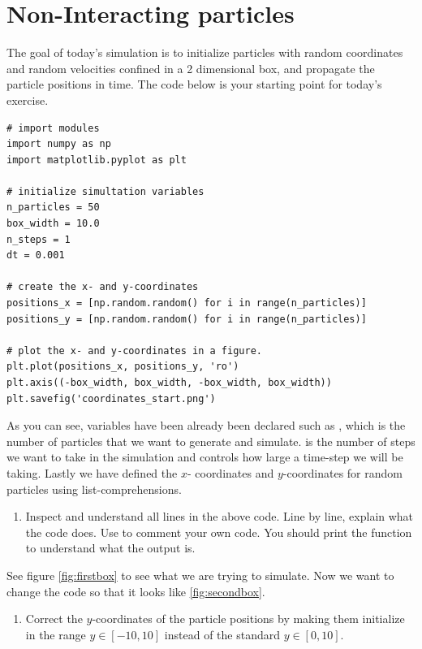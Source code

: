 \documentclass{article}
\begin{document}
%
%
%

\newpage
\section{Non-Interacting particles}

The goal of today's simulation is to initialize particles with random coordinates and random velocities confined in a 2 dimensional box, and propagate the particle positions in time.
%
The code below is your starting point for today's exercise.

\begin{lstlisting}
# import modules
import numpy as np
import matplotlib.pyplot as plt

# initialize simultation variables
n_particles = 50
box_width = 10.0
n_steps = 1
dt = 0.001

# create the x- and y-coordinates
positions_x = [np.random.random() for i in range(n_particles)]
positions_y = [np.random.random() for i in range(n_particles)]

# plot the x- and y-coordinates in a figure.
plt.plot(positions_x, positions_y, 'ro')
plt.axis((-box_width, box_width, -box_width, box_width))
plt.savefig('coordinates_start.png')
\end{lstlisting}

As you can see, variables have been already been declared such as , which is the number of particles that we want to generate and simulate.
 is the number of steps we want to take in the simulation and  controls how large a time-step we will be taking.
Lastly we have defined the $x$- coordinates and $y$-coordinates for  random particles using list-comprehensions.

\begin{enumerate}
  \item Inspect and understand all lines in the above code.
        Line by line, explain what the code does. Use \code{\#} to comment your own code.
        You should print the  function to understand what the output is.
\end{enumerate}

See figure \ref{fig:firstbox} to see what we are trying to simulate.
Now we want to change the code so that it looks like \ref{fig:secondbox}.

\begin{enumerate}
  \item Correct the $y$-coordinates of the particle positions by making them initialize in the range $y \in [-10,10]$ instead of the standard $y \in [0,10]$.
\end{enumerate}
\end{document}
